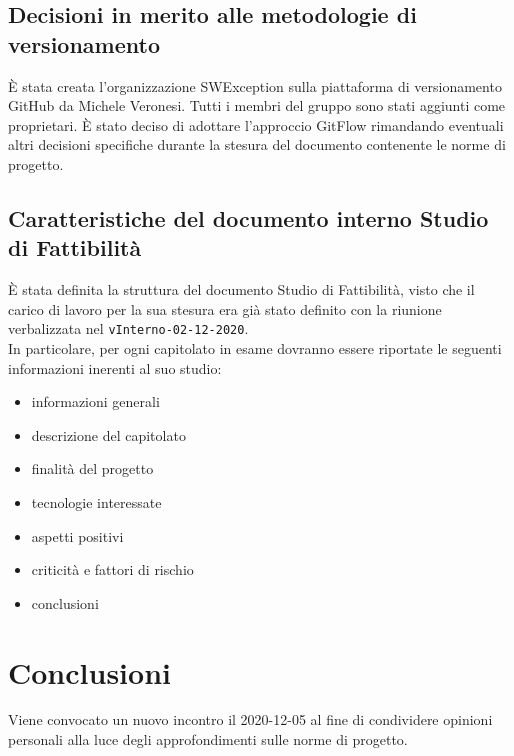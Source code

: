 \subsection{Decisioni in merito alle metodologie di versionamento}
È stata creata l'organizzazione SWException sulla piattaforma di versionamento GitHub da Michele Veronesi. Tutti i membri del gruppo sono stati aggiunti come proprietari. È stato deciso di adottare l'approccio GitFlow rimandando eventuali altri decisioni specifiche durante la stesura del documento contenente le norme di progetto.

\subsection{Caratteristiche del documento interno Studio di Fattibilità}
È stata definita la struttura del documento Studio di Fattibilità, visto che il carico di lavoro per la sua stesura era già stato definito con la riunione verbalizzata nel \verb|vInterno-02-12-2020|.\\
In particolare, per ogni capitolato in esame dovranno essere riportate le seguenti informazioni inerenti al suo studio:
\begin{itemize}
	\item informazioni generali
	\item descrizione del capitolato
	\item finalità del progetto
	\item tecnologie interessate
	\item aspetti positivi
	\item criticità e fattori di rischio
	\item conclusioni
\end{itemize}

\section{Conclusioni}
Viene convocato un nuovo incontro il 2020-12-05 al fine di condividere opinioni personali alla luce degli approfondimenti sulle norme di progetto.